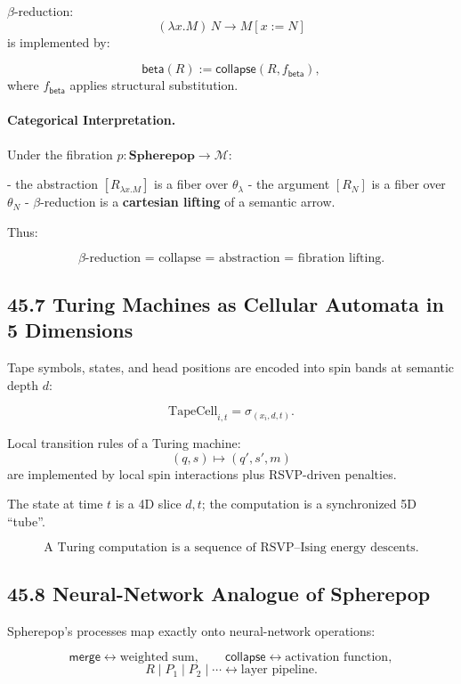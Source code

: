 \documentclass[12pt,letterpaper]{article}
\theoremstyle{remark}
\begin{document}
$\beta$-reduction:
\[
(\lambda x.M)\,N \to M[x:=N]
\]
is implemented by:

\[
\mathsf{beta}(R) 
:= 
\mathsf{collapse}(R, f_{\mathsf{beta}}),
\]
where $f_{\mathsf{beta}}$ applies structural substitution.

\paragraph{Categorical Interpretation.}  
Under the fibration $p : \mathbf{Spherepop} \to \mathcal{M}$:

- the abstraction $[R_{\lambda x.M}]$ is a fiber over $\theta_{\lambda}$  
- the argument $[R_N]$ is a fiber over $\theta_N$  
- $\beta$-reduction is a \textbf{cartesian lifting} of a semantic arrow.

Thus:

\[
\boxed{
\beta\text{-reduction = collapse = abstraction = fibration lifting}.
}
\]

\subsection{45.7 Turing Machines as Cellular Automata in 5 Dimensions}

Tape symbols, states, and head positions are encoded into spin bands 
at semantic depth $d$:

\[
\text{TapeCell}_{i,t} = \sigma_{(x_i,d,t)}.
\]

Local transition rules of a Turing machine:
\[
(q, s) \mapsto (q',s',m)
\]
are implemented by local spin interactions plus RSVP-driven penalties.

The state at time $t$ is a 4D slice $d,t$;  
the computation is a synchronized 5D ``tube''.

\[
\boxed{
\text{A Turing computation is a sequence of RSVP--Ising energy descents.}
}
\]

\subsection{45.8 Neural-Network Analogue of Spherepop}

Spherepop's processes map exactly onto neural-network operations:

\[
\mathsf{merge} \longleftrightarrow \text{weighted sum},\qquad
\mathsf{collapse} \longleftrightarrow \text{activation function},
\]
\[
R \mid P_1 \mid P_2 \mid \cdots \longleftrightarrow \text{layer pipeline}.
\]
\end{document}
